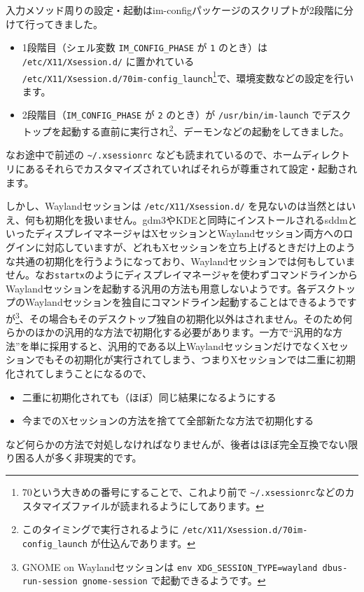 \documentclass[mingoth,a4paper]{jsarticle}
\begin{document}
入力メソッド周りの設定・起動はim-configパッケージのスクリプトが2段階に分けて行ってきました。
\begin{itemize}
 \item 1段階目（シェル変数 \verb|IM_CONFIG_PHASE| が \verb|1| のとき）は \verb|/etc/X11/Xsession.d/| に置かれている\\
 \verb|/etc/X11/Xsession.d/70im-config_launch|\footnote{70という大きめの番号にすることで、これより前で \texttt{\~{}/.xsessionrc}などのカスタマイズファイルが読まれるようにしてあります。}で、環境変数などの設定を行います。
 \item 2段階目（\verb|IM_CONFIG_PHASE| が \verb|2| のとき）が \verb|/usr/bin/im-launch| でデスクトップを起動する直前に実行され\footnote{このタイミングで実行されるように \texttt{/etc/X11/Xsession.d/70im-config\_launch} が仕込んであります。}、デーモンなどの起動をしてきました。
\end{itemize}
なお途中で前述の \verb|~/.xsessionrc| なども読まれているので、ホームディレクトリにあるそれらでカスタマイズされていればそれらが尊重されて設定・起動されます。

しかし、Waylandセッションは \verb|/etc/X11/Xsession.d/| を見ないのは当然とはいえ、何も初期化を扱いません。gdm3やKDEと同時にインストールされるsddmといったディスプレイマネージャはXセッションとWaylandセッション両方へのログインに対応していますが、どれもXセッションを立ち上げるときだけ上のような共通の初期化を行うようになっており、Waylandセッションでは何もしていません。なお\verb|startx|のようにディスプレイマネージャを使わずコマンドラインからWaylandセッションを起動する汎用の方法も用意しないようです。各デスクトップのWaylandセッションを独自にコマンドライン起動することはできるようですが\footnote{GNOME on Waylandセッションは \texttt{env XDG\_SESSION\_TYPE=wayland dbus-run-session gnome-session} で起動できるようです。}、その場合もそのデスクトップ独自の初期化以外はされません。そのため何らかのほかの汎用的な方法で初期化する必要があります。一方で``汎用的な方法''を単に採用すると、汎用的である以上WaylandセッションだけでなくXセッションでもその初期化が実行されてしまう、つまりXセッションでは二重に初期化されてしまうことになるので、
\begin{itemize}
 \item 二重に初期化されても（ほぼ）同じ結果になるようにする
 \item 今までのXセッションの方法を捨てて全部新たな方法で初期化する
\end{itemize}
など何らかの方法で対処しなければなりませんが、後者はほぼ完全互換でない限り困る人が多く非現実的です。
\end{document}
